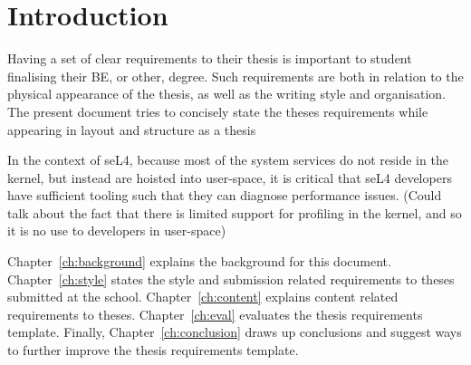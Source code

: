 \chapter{Introduction}\label{ch:intro}

Having a set of clear requirements to their thesis is important to student
finalising their BE, or other, degree.  Such requirements are both in
relation to the physical appearance of the thesis, as well as the writing
style and organisation.  The present document tries to concisely state the
theses requirements while appearing in layout and structure as a thesis

In the context of seL4, because most of the system services do not reside in the kernel, but instead are hoisted into user-space, it is critical that seL4 developers have sufficient tooling such that they can diagnose performance issues. (Could talk about the fact that there is limited support for profiling in the kernel, and so it is no use to developers in user-space)

Chapter~\ref{ch:background} explains the background for this document.
Chapter~\ref{ch:style} states the style and submission related requirements
to theses submitted at the school.
Chapter~\ref{ch:content} explains content related requirements to theses.
Chapter~\ref{ch:eval} evaluates the thesis requirements template.  Finally,
Chapter~\ref{ch:conclusion} draws up conclusions and suggest ways to
further improve the thesis requirements template.

